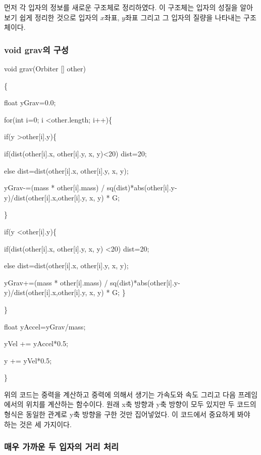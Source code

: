 \documentclass{gshs-hutech}
\begin{document}
먼저 각 입자의 정보를 새로운 구조체로 정리하였다. 이 구조체는 입자의 성질을 알아보기 쉽게 정리한 것으로 입자의 $x$좌표, $y$좌표 그리고 그 입자의 질량을 나타내는 구조체이다. 

\subsubsection{void grav의 구성}
\begin{tiny}
void grav(Orbiter [] other)  

    \{
    	
    	float yGrav=0.0;
    	
    	for(int i=0; i \textless other.length; i++)\{
    		
    		if(y \textgreater other[i].y)\{
    			
    			if(dist(other[i].x, other[i].y, x, y)<20) dist=20;
    			
    			else dist=dist(other[i].x, other[i].y, x, y);
    			
    			yGrav-=(mass * other[i].mass) / sq(dist)*abs(other[i].y-y)/dist(other[i].x,other[i].y, x, y) * G;
    			 
    		\}
    		
    		if(y \textless other[i].y)\{
    			
    			if(dist(other[i].x, other[i].y, x, y) \textless 20) dist=20;
    			
    			else dist=dist(other[i].x, other[i].y, x, y);
    			
    			yGrav+=(mass * other[i].mass) / sq(dist)*abs(other[i].y-y)/dist(other[i].x,other[i].y, x, y) * G;
    		\}
    		
    	\}
    	
    	float yAccel=yGrav/mass;
    	
    	yVel += yAccel*0.5;
    	
    	y += yVel*0.5;
    	
    \}
\end{tiny}
    
위의 코드는 중력을 계산하고 중력에 의해서 생기는 가속도와 속도 그리고 다음 프레임에서의 위치를 계산하는 함수이다. 원래 x축 방향과 y축 방향이 모두 있지만 두 코드의 형식은 동일한 관계로 y축 방향을 구한 것만 집어넣었다. 이 코드에서 중요하게 봐야 하는 것은 세 가지이다.

\subsubsection{매우 가까운 두 입자의 거리 처리} \label{two_close_particle}
\end{document}
